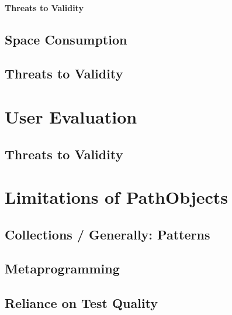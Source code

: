 \paragraph{Threats to Validity}

\subsection{Space Consumption}
\label{s:space-consumption}

\subsection{Threats to Validity}

\section{User Evaluation}
\subsection{Threats to Validity}

\section{Limitations of PathObjects}
\subsection{Collections / Generally: Patterns}
\subsection{Metaprogramming}
\subsection{Reliance on Test Quality}